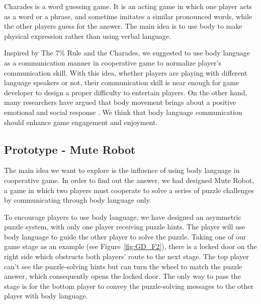 Charades\cite{GD3} is a word guessing game. It is an acting game in which one player acts as a word or a phrase, and sometime imitates a similar pronounced words, while the other players guess for the answer. The main idea is to use body to make physical expression rather than using verbal language. 


Inspired by The 7\% Rule and the Charades, we suggested to use body language as a communication manner in cooperative game to normalize player's communication skill. With this idea, whether players are playing with different language speakers or not, their communication skill is near enough for game developer to design a proper difficulty to entertain players. On the other hand, many researchers have argued that body movement brings about a positive emotional and social response \cite{GD7, GD8, GD9}. We think that body language communication should enhance game engagement and enjoyment.


\subsection{Prototype - Mute Robot}


The main idea we want to explore is the influence of using body language in cooperative game. In order to find out the answer, we had designed Mute Robot, a game in which two players must cooperate to solve a series of puzzle challenges by communicating through body language only.

To encourage players to use body language, we have designed an asymmetric puzzle system, with only one player receiving puzzle hints. The player will use body language to guide the other player to solve the puzzle. Taking one of our game stage as an example (see Figure~\ref{fig:GD_F2}), there is a locked door on the right side which obstructs both players’ route to the next stage. The top player can't see the puzzle-solving hints but can turn the wheel to match the puzzle answer, which consequently opens the locked door. The only way to pass the stage is for the bottom player to convey the puzzle-solving messages to the other player with body language.

